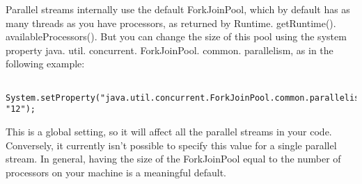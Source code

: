 Parallel streams internally use the default ForkJoinPool, which by default has as many threads as you have processors, as returned by Runtime. getRuntime(). availableProcessors(). But you can change the size of this pool using the system property java. util. concurrent. ForkJoinPool. common. parallelism, as in the following example:

\begin{lstlisting}
	System.setProperty("java.util.concurrent.ForkJoinPool.common.parallelism", "12");	
\end{lstlisting}

This is a global setting, so it will affect all the parallel streams in your code. Conversely, it currently isn’t possible to specify this value for a single parallel stream. In general, having the size of the ForkJoinPool equal to the number of processors on your machine is a meaningful default.
